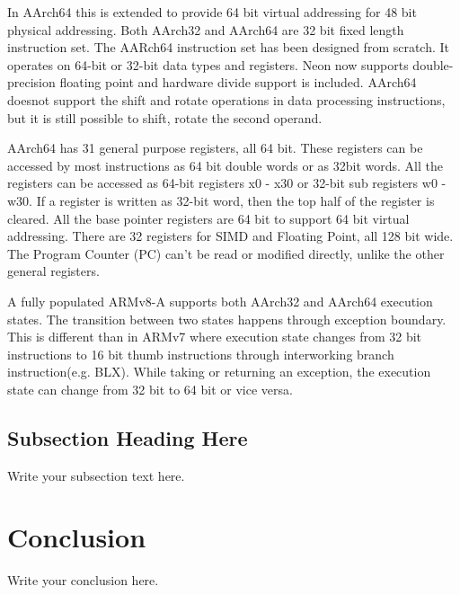 \documentclass[journal]{IEEEtran}
\begin{document}
In AArch64 this is extended to provide 64 bit virtual addressing for 48 bit physical addressing.  Both AArch32 and AArch64 are 32 bit fixed length instruction set.  The AARch64 instruction set has been designed from scratch.  It operates on 64-bit or 32-bit data types and registers.  Neon now supports double-precision floating point and hardware divide support is included.  AArch64 doesnot support the shift and rotate operations in data processing instructions,  but it is still possible to shift, rotate the second operand.

AArch64 has 31 general purpose registers, all 64 bit.  These registers can be accessed by most instructions as 64 bit double words or as 32bit words.  All the registers can be accessed as 64-bit registers x0 - x30 or 32-bit sub registers w0 - w30.  If a register is written as 32-bit word, then the top half of the register is cleared.  All the base pointer registers are 64 bit to support 64 bit virtual addressing.  There are 32 registers for SIMD and Floating Point, all 128 bit wide.  The Program Counter (PC) can't be read or modified directly, unlike the other general registers.  

A fully populated ARMv8-A supports both AArch32 and AArch64 execution states. The transition between two states happens through exception boundary.  This is different than in ARMv7 where execution state changes from 32 bit instructions to 16 bit thumb instructions through interworking branch instruction(e.g. BLX). While taking or returning an exception, the execution state can change from 32 bit to 64 bit or vice versa.

\subsection{Subsection Heading Here}
Write your subsection text here.

\section{Conclusion}
Write your conclusion here.
\end{document}
